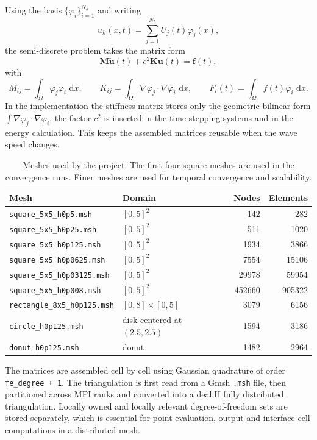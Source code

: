 \documentclass[11pt,a4paper]{article}
\newcommand{\dd}{\,\mathrm{d}}
\newcommand{\Uh}{\mathbf{u}}
\newcommand{\M}{\mathbf{M}}
\newcommand{\K}{\mathbf{K}}
\newcommand{\F}{\mathbf{f}}
\begin{document}
Using the basis $\{\varphi_i\}_{i=1}^{N_h}$ and writing
\[
u_h(x,t)=\sum_{j=1}^{N_h} U_j(t)\varphi_j(x),
\]
the semi-discrete problem takes the matrix form
\begin{equation}
\M \ddot{\Uh}(t) + c^2\K\Uh(t)=\F(t),
\label{eq:semidiscrete}
\end{equation}
with
\begin{equation}
M_{ij}=\int_\Omega \varphi_j\varphi_i\,\dd x,
\qquad
K_{ij}=\int_\Omega \nabla\varphi_j\cdot\nabla\varphi_i\,\dd x,
\qquad
F_i(t)=\int_\Omega f(t)\varphi_i\,\dd x .
\end{equation}
In the implementation the stiffness matrix stores only the geometric bilinear
form $\int\nabla\varphi_j\cdot\nabla\varphi_i$, the factor $c^2$ is inserted in
the time-stepping systems and in the energy calculation.  This keeps the
assembled matrices reusable when the wave speed changes.

\begin{table}[H]
\centering
\caption{Meshes used by the project.  The first four square meshes are used in
the convergence runs. Finer meshes are used for temporal convergence and
scalability.}
\label{tab:meshes}
\begin{tabular}{llrr}
\toprule
Mesh & Domain & Nodes & Elements \\
\midrule
\texttt{square\_5x5\_h0p5.msh}     & $[0,5]^2$ & 142 & 282 \\
\texttt{square\_5x5\_h0p25.msh}    & $[0,5]^2$ & 511 & 1020 \\
\texttt{square\_5x5\_h0p125.msh}   & $[0,5]^2$ & 1934 & 3866 \\
\texttt{square\_5x5\_h0p0625.msh}  & $[0,5]^2$ & 7554 & 15106 \\
\texttt{square\_5x5\_h0p03125.msh} & $[0,5]^2$ & 29978 & 59954 \\
\texttt{square\_5x5\_h0p008.msh}   & $[0,5]^2$ & 452660 & 905322 \\
\texttt{rectangle\_8x5\_h0p125.msh} & $[0,8]\times[0,5]$ & 3079 & 6156 \\
\texttt{circle\_h0p125.msh} & disk centered at $(2.5,2.5)$ & 1594 & 3186 \\
\texttt{donut\_h0p125.msh} & donut & 1482 & 2964 \\
\bottomrule
\end{tabular}
\end{table}

The matrices are assembled cell by cell using Gaussian quadrature of order
\texttt{fe\_degree + 1}.  The triangulation is first read from a Gmsh
\texttt{.msh} file, then partitioned across MPI ranks and converted into a
deal.II fully distributed triangulation.  Locally owned and locally relevant
degree-of-freedom sets are stored separately, which is essential for point
evaluation, output and interface-cell computations in a distributed mesh.
\end{document}
